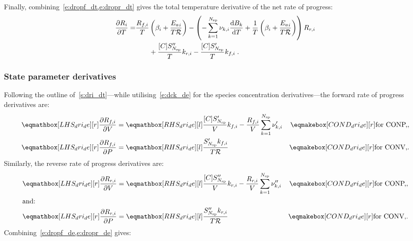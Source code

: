 \documentclass[12pt,number,sort&compress]{elsarticle}
\begin{document}
Finally, combining~\cref{e:dropf_dt,e:dropr_dt} gives the total temperature derivative of the net rate of progress:
\begin{align}
 \label{e:drop_dT}
 \frac{\partial R_{i}}{\partial T } =& \frac{{R_{f, i}}}{T} \left(\beta_{i} + \frac{{E_{a}}_{i}}{T \Ru/}\right) - \left(- \sum_{k=1}^{\ns/} \nu_{k,i} \frac{\text{d} B_{k} }{\text{d} T } + \frac{1}{T} \left(\beta_{i} + \frac{{E_{a}}_{i}}{T \Ru/}\right)\right) {R_{r, i}} \nonumber \\
				      &\qquad + \frac{[C] S^{\prime\prime}_{\ns/}}{T} {k_{r, i}} - \frac{[C] S^{\prime}_{\ns/}}{T} {k_{f, i}}\;.
\end{align}

\subsubsection{State parameter derivatives}
\label{s:dri_de}
Following the outline of~\cref{s:dri_dt}---while utilising~\cref{e:dck_de} for the species concentration derivatives---the forward rate of progress derivatives are:
\begin{subequations}
 \label{e:dropf_de}
 \begin{align}
  \lhs{dri_de}{\frac{\partial {R_{f, i}} }{\partial V }} &= \rhs{dri_de}{\frac{[C] S^{\prime}_{\ns/}}{V} {k_{f, i}} - \frac{{R_{f, i}}}{V} \sum_{k=1}^{\ns/} \nu^{\prime}_{k,i}}&\cond{dri_de}{\dconp/,}\\
  \lhs{dri_de}{\frac{\partial {R_{f, i}} }{\partial P }} &= \rhs{dri_de}{\frac{S^{\prime}_{\ns/} {k_{f, i}}}{T \Ru/}}&\cond{dri_de}{\dconv/.}
 \end{align}
\end{subequations}
Similarly, the reverse rate of progress derivatives are:
\begin{subequations}
 \label{e:dropr_de}
 \begin{align}
  \lhs{dri_de}{\frac{\partial {R_{r, i}} }{\partial V }} &= \rhs{dri_de}{\frac{[C] S^{\prime\prime}_{\ns/}}{V} {k_{r, i}} - \frac{{R_{r, i}}}{V} \sum_{k=1}^{\ns/} \nu^{\prime\prime}_{k,i}}&\cond{dri_de}{\dconp/,}\\
  \intertext{and:}
  \lhs{dri_de}{\frac{\partial {R_{r, i}} }{\partial P }} &= \rhs{dri_de}{\frac{S^{\prime\prime}_{\ns/} {k_{r, i}}}{T \Ru/}}&\cond{dri_de}{\dconv/.}
 \end{align}
\end{subequations}
Combining~\cref{e:dropf_de,e:dropr_de} gives:
\end{document}
